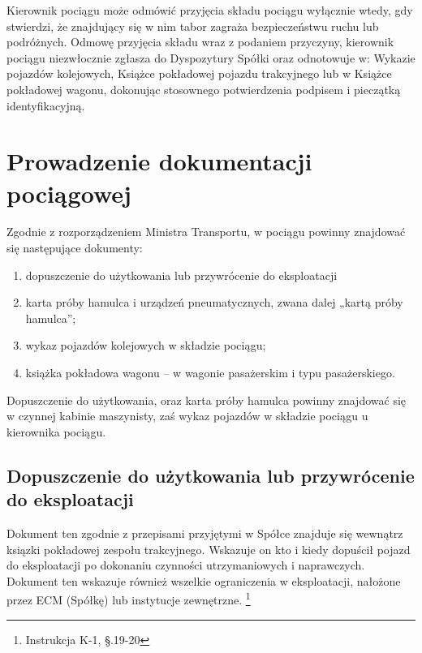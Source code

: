 Kierownik pociągu może odmówić przyjęcia składu pociągu wyłącznie wtedy, gdy stwierdzi, że znajdujący się w nim tabor zagraża bezpieczeństwu ruchu lub podróżnych. Odmowę przyjęcia składu wraz z podaniem przyczyny, kierownik pociągu niezwłocznie zgłasza do Dyspozytury Spółki oraz odnotowuje w:
Wykazie pojazdów kolejowych, Książce pokładowej pojazdu trakcyjnego lub w Książce pokładowej wagonu, dokonując stosownego potwierdzenia podpisem
i pieczątką identyfikacyjną.


\chapter{Prowadzenie dokumentacji pociągowej}

Zgodnie z rozporządzeniem Ministra Transportu, w pociągu powinny znajdować się następujące dokumenty:
\begin{enumerate}
	\item dopuszczenie do użytkowania lub przywrócenie do eksploatacji
	\item karta próby hamulca i urządzeń pneumatycznych, zwana dalej „kartą próby hamulca”;
	\item wykaz pojazdów kolejowych w składzie pociągu;
	\item książka pokładowa wagonu – w wagonie pasażerskim i typu pasażerskiego.
\end{enumerate}

Dopuszczenie do użytkowania, oraz karta próby hamulca powinny znajdować się w czynnej kabinie maszynisty, zaś wykaz pojazdów w składzie pociągu u kierownika pociągu.

\section{Dopuszczenie do użytkowania lub przywrócenie do eksploatacji}
Dokument ten zgodnie z przepisami przyjętymi w Spółce znajduje się wewnątrz ksiązki pokładowej zespołu trakcyjnego. Wskazuje on kto i kiedy dopuścił pojazd do eksploatacji po dokonaniu czynności utrzymaniowych i naprawczych. Dokument ten wskazuje również wszelkie ograniczenia w eksploatacji, nałożone przez ECM (Spółkę) lub instytucje zewnętrzne.
\footnote{Instrukcja K-1, \S.19-20}


